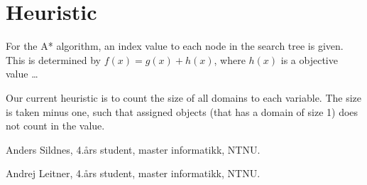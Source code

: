 \documentclass[journal]{IEEEtran}
\begin{document}
\section{Heuristic}
For the A* algorithm, an index value to each node in the search tree is given.
This is determined by $f(x) = g(x) + h(x)$, where $h(x)$ is a objective value \dots

Our current heuristic is to count the size of all domains to each variable.
The size is taken minus one, such that assigned objects (that has a domain
of size 1) does not count in the value. 

\begin{IEEEbiographynophoto}{Anders Sildnes,}
    4.års student, master informatikk, NTNU.\
\end{IEEEbiographynophoto}
\begin{IEEEbiographynophoto}{Andrej Leitner,}
    4.års student, master informatikk, NTNU.\
\end{IEEEbiographynophoto}

    
%
%
%
%
%
% 
\end{document}
